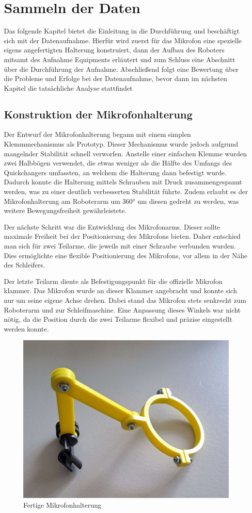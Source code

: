 \chapter{Sammeln der Daten}
\label{Kapitel5}

Das folgende Kapitel bietet die Einleitung in die Durchführung und beschäftigt sich mit der Datenaufnahme. Hierfür wird zuerst für das Mikrofon eine spezielle eigens angefertigten Halterung konstruiert, dann der Aufbau des Roboters mitsamt des Aufnahme Equipments erläutert und zum Schluss eine Abschnitt über die Durchführung der Aufnahme. Abschließend folgt eine Bewertung über die Probleme und Erfolge bei der Datenaufnahme, bevor dann im nächsten Kapitel die tatsächliche Analyse stattfindet

\section{Konstruktion der Mikrofonhalterung}

Der Entwurf der Mikrofonhalterung begann mit einem simplen Klemmmechanismus als Prototyp. Dieser Mechanismus wurde jedoch aufgrund mangelnder Stabilität schnell verworfen. Anstelle einer einfachen Klemme wurden zwei Halbbögen verwendet, die etwas weniger als die Hälfte des Umfangs des Quickchangers umfassten, an welchem die Halterung dann befestigt wurde. Dadurch konnte die Halterung mittels Schrauben mit Druck zusammengespannt werden, was zu einer deutlich verbesserten Stabilität führte. Zudem erlaubt es der Mikrofonhalterung am Roboterarm um 360° um diesen gedreht zu werden, was weitere Bewegungsfreiheit gewährleistete.

Der nächste Schritt war die Entwicklung des Mikrofonarms. Dieser sollte maximale Freiheit bei der Positionierung des Mikrofons bieten. Daher entschied man sich für zwei Teilarme, die jeweils mit einer Schraube verbunden wurden. Dies ermöglichte eine flexible Positionierung des Mikrofons, vor allem in der Nähe des Schleifers.

Der letzte Teilarm diente als Befestigungspunkt für die offizielle Mikrofon klammer. Das Mikrofon wurde an dieser Klammer angebracht und konnte sich nur um seine eigene Achse drehen. Dabei stand das Mikrofon stets senkrecht zum Roboterarm und zur Schleifmaschine. Eine Anpassung dieses Winkels war nicht nötig, da die Position durch die zwei Teilarme flexibel und präzise eingestellt werden konnte.

\begin{figure}[H]
    \centering
    \includegraphics[width=0.5\linewidth]{images/Mikrofonhalterung.jpg}
    \caption{Fertige Mikrofonhalterung}
    \label{fig:Mikrofonhalterung}
\end{figure}

